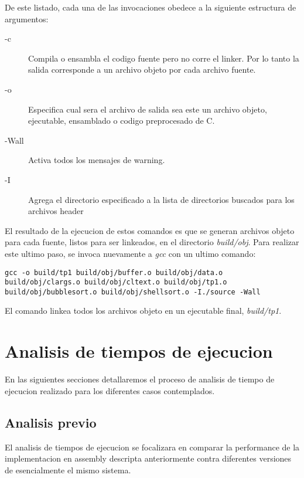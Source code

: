 \documentclass[a4paper,11pt]{article}
\begin{document}
De este listado, cada una de las invocaciones obedece a la siguiente estructura
de argumentos:

\begin{description}

  \item[-c] Compila o ensambla el codigo fuente pero no corre el linker.  Por
    lo tanto la salida corresponde a un archivo objeto por cada archivo fuente.

  \item[-o] Especifica cual sera el archivo de salida sea este un archivo
    objeto, ejecutable, ensamblado o codigo preprocesado de C.

  \item[-Wall] Activa todos los mensajes de warning.

  \item[-I] Agrega el directorio especificado a la lista de directorios
    buscados para los archivos header

\end{description}

El resultado de la ejecucion de estos comandos es que se generan archivos
objeto para cada fuente, listos para ser linkeados, en el directorio
\textit{build/obj}. Para realizar este ultimo paso, se invoca nuevamente a
\textit{gcc} con un ultimo comando:

\begin{lstlisting}
gcc -o build/tp1 build/obj/buffer.o build/obj/data.o build/obj/clargs.o build/obj/cltext.o build/obj/tp1.o build/obj/bubblesort.o build/obj/shellsort.o -I./source -Wall 
\end{lstlisting}

El comando linkea todos los archivos objeto en un ejecutable final,
\textit{build/tp1}.

\section{Analisis de tiempos de ejecucion}

En las siguientes secciones detallaremos el proceso de analisis de tiempo de
ejecucion realizado para los diferentes casos contemplados.

\subsection{Analisis previo}\label{sec:tiempos}

El analisis de tiempos de ejecucion se focalizara en comparar la performance de
la implementacion en assembly descripta anteriormente contra diferentes
versiones de esencialmente el mismo sistema.
\end{document}
